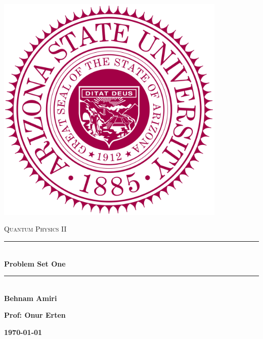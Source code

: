 \documentclass[fleqn]{article}
\begin{document}
  \begin{titlepage}

    \newcommand{\HRule}{\rule{\linewidth}{0.5mm}}

    \center

    \begin{center}
      \includegraphics[height=11cm, width=11cm]{asu.png}
    \end{center}

    \vline

    \textsc{\LARGE Quantum Physics II}\\[1.5cm]

    \HRule \\[0.5cm]
    { \huge \bfseries Problem Set One}\\[0.4cm] 
    \HRule \\[1.0cm]

    \textbf{Behnam Amiri}

    \bigbreak

    \textbf{Prof: Onur Erten}

    \bigbreak

    \textbf{{\large \today}\\[2cm]}

    \vfill

  \end{titlepage}
\end{document}
